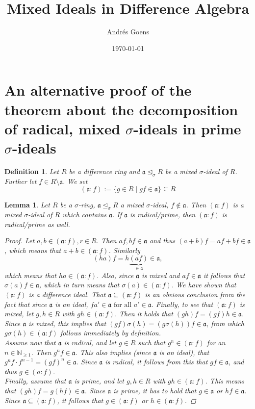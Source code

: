 \documentclass{article}
\title{Mixed Ideals in Difference Algebra}
\author{Andr\'{e}s Goens}
\date{\today}
\def\NE{\mathbb{N}_{\geq1}}
\def\a{\mathfrak{a}}
\def\s{\sigma}
\def\si{\unlhd_{\sigma}}
\def\fa{\text{ for all }}
\newenvironment{bew}{\begin{proof}[Proof]}{\end{proof}}
\theoremstyle{plain}
\newtheorem{lem}[Satz]{Lemma}
\newtheorem{defn}[Satz]{Definition}
\theoremstyle{definition}
\begin{document}
\setlength{\parindent}{1.5em}
\section{An alternative proof of the theorem about the decomposition of radical, mixed $\s$-ideals in prime $\s$-ideals}
\begin{defn}
Let $R$ be a difference ring and $\a \si R$ be a mixed $\s$-ideal of $R$. Further let $f \in R \setminus \a$. We set $$(\a:f):= \{ g \in R \mid gf \in \a \} \subseteq R$$
\end{defn}

\begin{lem}
Let $R$ be a $\s$-ring, $\a \si R$ a mixed $\s$-ideal, $f \notin \a$. Then $(\a:f)$ is a mixed $\s$-ideal of $R$ which contains $\a$. If $\a$ is radical/prime, then $(\a:f)$ is radical/prime as well.
\begin{bew}
Let $a,b \in (\a:f), r \in R$. Then $af, bf \in \a$ and thus $(a + b)f = af + bf \in \a$, which means that $a + b \in (\a:f)$. Similarly $$(ha)f = h\underbrace{(af)}_{\in \a} \in \a,$$
which means that $ha \in (\a:f)$. Also, since $\a$ is mixed and $af \in \a$ it follows that $\s(a)f \in \a$, which in turn means that $\s(a) \in (\a:f)$. We have shown that $(\a:f)$ is a difference ideal. 
That $\a \subseteq (\a:f)$ is an obvious conclusion from the fact that since $\a$ is an ideal, $fa' \in \a \fa a' \in \a$.  Finally, to see that $(\a:f)$ is mixed,
let $g,h \in R$ with $gh \in (\a:f)$. Then it holds that $(gh)f = (gf)h  \in \a$. Since $\a$ is mixed, this implies that $(gf)\s(h) = (g\s(h))f \in \a$, from which $g\s(h) \in (\a:f)$ follows immediately by definition. \\
\indent Assume now that $\a$ is radical, and let $g \in R$ such that $g^n \in (\a:f)$ for an $n \in \NE$. Then $g^nf \in \a$. This also implies (since $\a$ is an ideal), that $g^nf \cdot f^{n-1} = (gf)^n \in \a$.
Since $\a$ is radical, it follows from this that $gf \in \a$, and thus $g \in (a:f)$.\\ 
\indent Finally, assume that $\a$ is prime, and let $g, h \in R$ with $gh \in (\a:f)$. This means that $(gh)f = g(hf) \in \a$. Since $\a$ is prime, it has to hold that $g \in \a$ or $hf \in \a$. Since $\a \subseteq (\a:f)$, it follows that $g \in (\a:f)$ or $h \in (\a:f)$.
\end{bew}
\end{lem}
\end{document}
